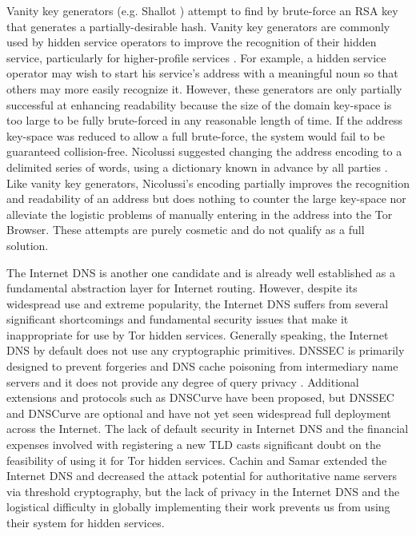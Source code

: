 \documentclass[conference]{IEEEtran}
\begin{document}
Vanity key generators (e.g. Shallot \cite{KatmagicShallot}) attempt to find by brute-force an RSA key that generates a partially-desirable hash. Vanity key generators are commonly used by hidden service operators to improve the recognition of their hidden service, particularly for higher-profile services \cite{syversongenuine}. For example, a hidden service operator may wish to start his service's address with a meaningful noun so that others may more easily recognize it. However, these generators are only partially successful at enhancing readability because the size of the domain key-space is too large to be fully brute-forced in any reasonable length of time. If the address key-space was reduced to allow a full brute-force, the system would fail to be guaranteed collision-free. Nicolussi suggested changing the address encoding to a delimited series of words, using a dictionary known in advance by all parties \cite{nicolussi2011human}. Like vanity key generators, Nicolussi's encoding partially improves the recognition and readability of an address but does nothing to counter the large key-space nor alleviate the logistic problems of manually entering in the address into the Tor Browser. These attempts are purely cosmetic and do not qualify as a full solution.

The Internet DNS is another one candidate and is already well established as a fundamental abstraction layer for Internet routing. However, despite its widespread use and extreme popularity, the Internet DNS suffers from several significant shortcomings and fundamental security issues that make it inappropriate for use by Tor hidden services. Generally speaking, the Internet DNS by default does not use any cryptographic primitives. DNSSEC is primarily designed to prevent forgeries and DNS cache poisoning from intermediary name servers and it does not provide any degree of query privacy \cite{wachs2014censorship}. Additional extensions and protocols such as DNSCurve \cite{bernstein2009dnscurve} have been proposed, but DNSSEC and DNSCurve are optional and have not yet seen widespread full deployment across the Internet. The lack of default security in Internet DNS and the financial expenses involved with registering a new TLD casts significant doubt on the feasibility of using it for Tor hidden services. Cachin and Samar \cite{cachin2004secure} extended the Internet DNS and decreased the attack potential for authoritative name servers via threshold cryptography, but the lack of privacy in the Internet DNS and the logistical difficulty in globally implementing their work prevents us from using their system for hidden services.
\end{document}
